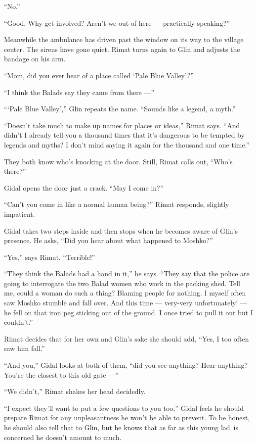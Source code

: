 \documentclass[twoside,11pt,openany]{book}
\begin{document}
``No.''

``Good. Why get involved? Aren't we out of here --- practically speaking?''

Meanwhile the ambulance has driven past the window on its way to the village center. The sirens have gone quiet. Rimat
turns again to Glin and adjusts the bandage on his arm.

``Mom, did you ever hear of a place called `Pale Blue Valley'?''

``I think the Balads say they came from there ---''

``{\thinspace}`Pale Blue Valley','' Glin repeats the name. ``Sounds like a legend, a
myth.''

``Doesn't take much to make up names for places or ideas,'' Rimat says. ``And
didn't I already tell you a thousand times that it's dangerous to be tempted by legends and myths? I don't mind saying
it again for the thousand and one time.''

They both know who's knocking at the door. Still, Rimat calls out, ``Who's there?''

Gidal opens the door just a crack. ``May I come in?''

``Can't you come in like a normal human being?'' Rimat responds, slightly
impatient.

Gidal takes two steps inside and then stops when he becomes aware of Glin's presence. He asks, ``Did you
hear about what happened to Moshko?''

``Yes,'' says Rimat. ``Terrible!''

``They think the Balads had a hand in it,'' he says. ``They say that the police
are going to interrogate the two Balad women who work in the packing shed. Tell me, could a woman do such a thing?
Blaming people for nothing. I myself often saw Moshko stumble and fall over. And this time --- very-very unfortunately!
--- he fell on that iron peg sticking out of the ground. I once tried to pull it out but I couldn't.''

Rimat decides that for her own and Glin's sake she should add, ``Yes, I too often saw him
fall.''

``And you,'' Gidal looks at both of them, ``did you see anything? Hear anything?
You're the closest to this old gate ---''

``We didn't,'' Rimat shakes her head decidedly.

``I expect they'll want to put a few questions to you too,'' Gidal feels he should prepare
Rimat for any unpleasantness he won't be able to prevent. To be honest, he should also tell that to Glin, but he knows
that as far as this young lad~is concerned he doesn't amount to much.
\end{document}
